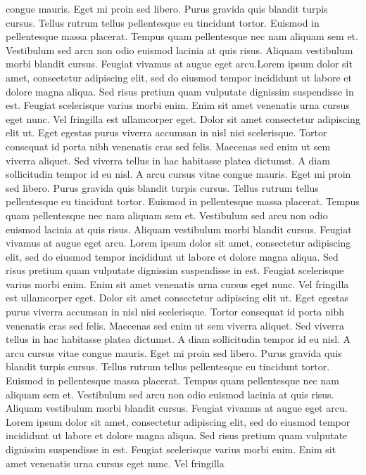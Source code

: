 congue mauris. Eget mi proin sed libero. Purus gravida quis blandit
turpis cursus. Tellus rutrum tellus pellentesque eu tincidunt tortor.
Euismod in pellentesque massa placerat. Tempus quam pellentesque nec nam
 aliquam sem et. Vestibulum sed arcu non odio euismod lacinia at quis
risus. Aliquam vestibulum morbi blandit cursus. Feugiat vivamus at augue
 eget arcu.Lorem ipsum dolor sit amet, consectetur adipiscing elit, sed do eiusmod
tempor incididunt ut labore et dolore magna aliqua. Sed risus pretium
quam vulputate dignissim suspendisse in est. Feugiat scelerisque varius
morbi enim. Enim sit amet venenatis urna cursus eget nunc. Vel fringilla
 est ullamcorper eget. Dolor sit amet consectetur adipiscing elit ut.
Eget egestas purus viverra accumsan in nisl nisi scelerisque. Tortor
consequat id porta nibh venenatis cras sed felis. Maecenas sed enim ut
sem viverra aliquet. Sed viverra tellus in hac habitasse platea
dictumst. A diam sollicitudin tempor id eu nisl. A arcu cursus vitae
congue mauris. Eget mi proin sed libero. Purus gravida quis blandit
turpis cursus. Tellus rutrum tellus pellentesque eu tincidunt tortor.
Euismod in pellentesque massa placerat. Tempus quam pellentesque nec nam
 aliquam sem et. Vestibulum sed arcu non odio euismod lacinia at quis
risus. Aliquam vestibulum morbi blandit cursus. Feugiat vivamus at augue
 eget arcu.
Lorem
 ipsum dolor sit amet, consectetur adipiscing elit, sed do eiusmod
tempor incididunt ut labore et dolore magna aliqua. Sed risus pretium
quam vulputate dignissim suspendisse in est. Feugiat scelerisque varius
morbi enim. Enim sit amet venenatis urna cursus eget nunc. Vel fringilla
 est ullamcorper eget. Dolor sit amet consectetur adipiscing elit ut.
Eget egestas purus viverra accumsan in nisl nisi scelerisque. Tortor
consequat id porta nibh venenatis cras sed felis. Maecenas sed enim ut
sem viverra aliquet. Sed viverra tellus in hac habitasse platea
dictumst. A diam sollicitudin tempor id eu nisl. A arcu cursus vitae
congue mauris. Eget mi proin sed libero. Purus gravida quis blandit
turpis cursus. Tellus rutrum tellus pellentesque eu tincidunt tortor.
Euismod in pellentesque massa placerat. Tempus quam pellentesque nec nam
 aliquam sem et. Vestibulum sed arcu non odio euismod lacinia at quis
risus. Aliquam vestibulum morbi blandit cursus. Feugiat vivamus at augue
 eget arcu.
Lorem
 ipsum dolor sit amet, consectetur adipiscing elit, sed do eiusmod
tempor incididunt ut labore et dolore magna aliqua. Sed risus pretium
quam vulputate dignissim suspendisse in est. Feugiat scelerisque varius
morbi enim. Enim sit amet venenatis urna cursus eget nunc. Vel fringilla
